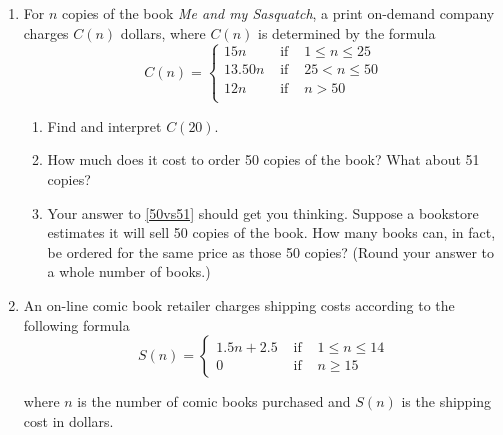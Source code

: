 \begin{enumerate}

\setcounter{enumi}{\value{HW}}



\item \label{piecewiseordering} For $n$ copies of the book \textit{Me and my Sasquatch}, a print on-demand company charges $C(n)$ dollars, where $C(n)$ is determined by the formula \[{\displaystyle C(n) = \left\{ \begin{array}{rcl}  15n & \mbox{ if } & 1 \leq n \leq 25  \\
                                                            13.50n  & \mbox{ if } & 25 < n \leq 50 \\
                                                            12n & \mbox{ if } & n > 50 \\
                                     \end{array} \right. }\]
                                     
                                     
\begin{enumerate}

\item  Find and interpret $C(20)$. 

\item  \label{50vs51} How much does it cost to order 50 copies of the book?  What about 51 copies?

\item  Your answer to \ref{50vs51} should get you thinking. Suppose a bookstore estimates it will sell 50 copies of the book.  How many books can, in fact, be ordered for the same price as those 50 copies? (Round your answer to a  whole number of books.)  

\end{enumerate}

\item \label{piecewiseshipping} An on-line comic book retailer charges shipping costs according to the following formula \[{\displaystyle S(n) = \left\{ \begin{array}{rcl}  1.5 n + 2.5 & \mbox{ if } & 1 \leq n \leq 14  \\
                                                            0  & \mbox{ if } & n \geq 15
                                     \end{array} \right. }\]
                                     
where $n$ is the number of  comic books purchased and $S(n)$ is the shipping cost in dollars.
                                     

\end{enumerate}
